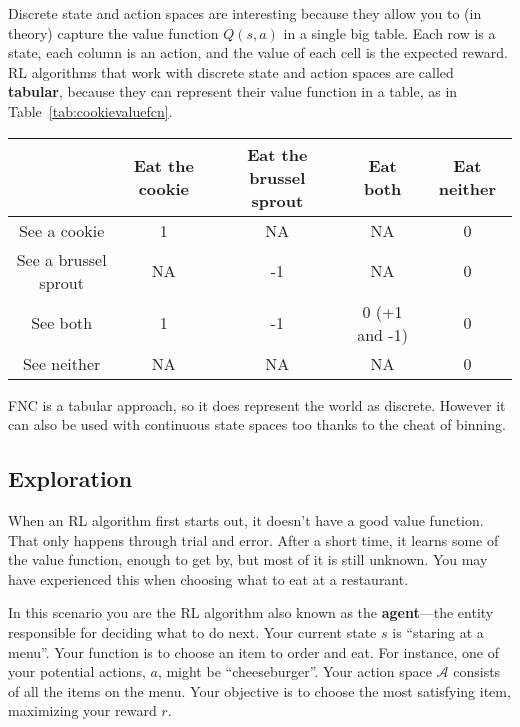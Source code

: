 Discrete state and action spaces are interesting because they allow you to
(in theory) capture the value function $Q(s, a)$ in a single big table.
Each row is a state, each column is an action, and the value of each cell
is the expected reward. RL algorithms that work with discrete state
and action spaces are called \textbf{tabular}, because they can represent
their value function in a table, as in Table~\ref{tab:cookievaluefcn}.

\begin{table*}[ht]
\centering
\begin{tabular}{c | c | c | c | c |}
& Eat the cookie & Eat the brussel sprout & Eat both & Eat neither \\
\hline
See a cookie & 1 & NA & NA & 0 \\
\hline
See a brussel sprout & NA & -1 & NA & 0 \\
\hline
See both & 1 & -1 & 0 (+1 and -1) & 0 \\
\hline
See neither & NA & NA & NA & 0 \\
\hline
\end{tabular}
\caption{Value function for the cookie/brussel sprout world}
\label{tab:cookievaluefcn}
\end{table*}


FNC is a tabular approach, so it does represent the world as discrete.
However it can also be used with continuous state spaces too thanks
to the cheat of binning.

\subsection{Exploration}
\label{subsec:introexploration}

When an RL algorithm first starts out, it doesn't have a good value function.
That only happens through trial and error. After a short time, it learns
some of the value function, enough to get by, but most of it is still unknown.
You may have experienced this when choosing what to eat at a restaurant.

In this scenario you are the RL algorithm also known as the
\textbf{agent}---the entity responsible for deciding what to do next.
Your current state $s$ is “staring at a menu”. Your function is to
choose an item to order and eat. For instance, one of your potential
actions, $a$, might be “cheeseburger”. Your action space $\mathcal{A}$
consists of all the items on the menu. Your objective is to choose the most
satisfying item, maximizing your reward $r$.


